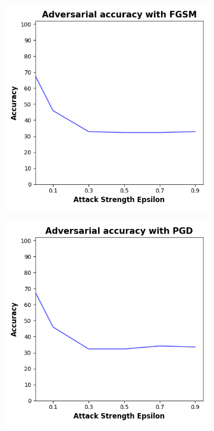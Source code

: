 \begin{figure}[!h]
  \centering

  \begin{subfigure}{0.45\textwidth}
      \includegraphics[width=\linewidth]{figures/evaluation_results/diabetes/pqc/figures/none-fgsm.png}
      \label{fig:diabetes3}
  \end{subfigure} \qquad
  \begin{subfigure}{0.45\textwidth}
      \includegraphics[width=\linewidth]{figures/evaluation_results/diabetes/pqc/figures/none-pgd.png}
      \label{fig:diabetes4}
  \end{subfigure}


\end{figure}

